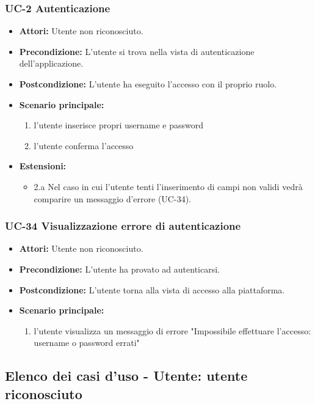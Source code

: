\subsubsection{UC-2 Autenticazione}
		\begin{itemize}
			\item \textbf{Attori:} Utente non riconosciuto.
			\item \textbf{Precondizione:} L'utente si trova nella vista di autenticazione dell'applicazione.
			\item \textbf{Postcondizione:} L'utente ha eseguito l'accesso con il proprio ruolo.
			\item \textbf{Scenario principale:}
				\begin{enumerate}
					\item l'utente inserisce propri username e password
					\item l'utente conferma l'accesso
				\end{enumerate}
				\item \textbf{Estensioni:}
				\begin{itemize}
					\item 2.a Nel caso in cui l'utente tenti l'inserimento di campi non validi vedrà comparire un messaggio d'errore (UC-34).
				\end{itemize}
		\end{itemize}
		
\subsubsection{UC-34 Visualizzazione errore di autenticazione}
		\begin{itemize}
			\item \textbf{Attori:} Utente non riconosciuto.
			\item \textbf{Precondizione:} L'utente ha provato ad autenticarsi.
			\item \textbf{Postcondizione:} L'utente torna alla vista di accesso alla piattaforma.
			\item \textbf{Scenario principale:}
			\begin{enumerate}
				\item l'utente visualizza un messaggio di errore "Impossibile effettuare l'accesso: username o password errati"
			\end{enumerate}
		\end{itemize}
		
\subsection{Elenco dei casi d'uso - Utente: utente riconosciuto}

